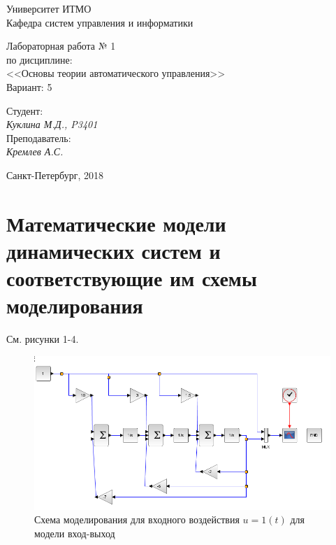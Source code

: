 \documentclass[12pt, a4paper] {ncc}
\begin{document}
\setcounter{figure}{0}
\frenchspacing
\pagestyle{empty}
\begin{center}
                            Университет ИТМО    \\
                        Кафедра систем управления и информатики


\end{center}
\begin{center}
			Лабораторная работа № 1\\
			по дисциплине: \\
		<<Основы теории автоматического управления>> \\
			Вариант: 5
\end{center}
\begin{flushright}
                                    Студент:\\
                                    {\it Куклина М.Д., P3401}\\
                                    Преподаватель: \\
                                    {\it Кремлев А.С.}
\end{flushright}
\begin{center}
                             Санкт-Петербург, 2018
\end{center}
\newpage

\section{Математические модели динамических систем и соответствующие им схемы моделирования}

	См. рисунки 1-4.

		\begin{figure}[ht!]
    		\includegraphics[scale=0.5]{./modelio1t.png}
			\caption{Схема моделирования для входного воздействия $u = 1(t)$ для модели вход-выход}
		\end{figure}
\end{document}
